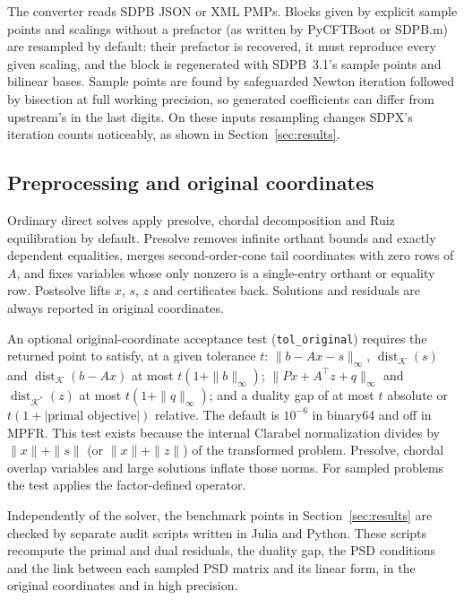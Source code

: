 \documentclass[11pt]{article}
\newcommand{\K}{\mathcal{K}}
\newcommand{\code}[1]{\texttt{#1}}
\begin{document}
The converter reads SDPB JSON or XML PMPs. Blocks given by explicit sample
points and scalings without a prefactor (as written by PyCFTBoot
\cite{Behan2017} or SDPB.m) are resampled by default: their prefactor is
recovered, it must reproduce every given scaling, and the block is
regenerated with SDPB~3.1's sample points and bilinear bases.
Sample points are found by safeguarded Newton iteration followed by bisection
at full working precision, so generated coefficients can differ from
upstream's in the last digits. On these inputs resampling changes SDPX's
iteration counts noticeably, as shown in Section~\ref{sec:results}.

\subsection{Preprocessing and original coordinates}

Ordinary direct solves apply presolve, chordal decomposition
\cite{VandenbergheAndersen2015} and Ruiz equilibration \cite{Ruiz2001} by
default. Presolve removes infinite orthant bounds and exactly dependent
equalities, merges second-order-cone tail coordinates with zero rows of $A$,
and fixes variables whose only nonzero is a single-entry orthant or equality
row. Postsolve lifts $x$, $s$, $z$ and certificates back. Solutions and
residuals are always reported in original coordinates.

An optional original-coordinate acceptance test (\code{tol\_original}) requires
the returned point to satisfy, at a given tolerance $t$:
$\|b-Ax-s\|_\infty$, $\operatorname{dist}_\K(s)$ and
$\operatorname{dist}_\K(b-Ax)$ at most $t(1+\|b\|_\infty)$;
$\|Px+A^\top z+q\|_\infty$ and $\operatorname{dist}_{\K^*}(z)$ at most
$t(1+\|q\|_\infty)$; and a duality gap of at most $t$ absolute or
$t(1+|\text{primal objective}|)$ relative. The default is $10^{-6}$ in binary64
and off in MPFR. This test exists because the internal Clarabel normalization
divides by $\|x\|+\|s\|$ (or $\|x\|+\|z\|$) of the transformed problem. Presolve,
chordal overlap variables and large solutions inflate those norms. For
sampled problems the test applies the factor-defined operator.

Independently of the solver, the benchmark points in
Section~\ref{sec:results} are checked by separate audit scripts written in
Julia and Python. These scripts recompute the primal and dual residuals,
the duality gap, the PSD conditions and the link between each sampled PSD
matrix and its linear form, in the original coordinates and in high precision.
\end{document}
